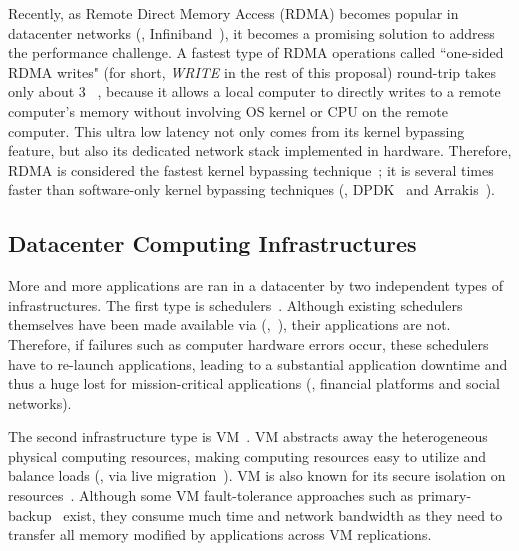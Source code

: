 Recently, as Remote Direct Memory Access (RDMA) becomes popular in datacenter 
networks (\eg, Infiniband~\cite{infiniband}), it becomes a promising solution 
to address the \paxos performance challenge. A fastest type of RDMA operations 
called ``one-sided RDMA writes" (for short, \emph{WRITE} in the rest of this 
proposal) round-trip takes only about 3 \us~\cite{pilaf:usenix14}, because it 
allows a local computer to directly writes to a remote computer's memory 
without involving OS kernel or CPU on the remote computer. This ultra low 
latency not only comes from its kernel bypassing feature, but also its 
dedicated network stack implemented in hardware. Therefore, RDMA is considered 
the fastest kernel bypassing 
technique~\cite{herd:sigcomm14,pilaf:usenix14,dare:hpdc15}; it is several times 
faster than software-only kernel bypassing techniques (\eg, 
DPDK~\cite{dpdk} and Arrakis~\cite{arrakis:osdi14}).

\vspace{-.15in}\subsection{Datacenter Computing Infrastructures}
\label{sec:datacenter}\vspace{-.075in}

More and more applications are ran in a datacenter by two 
independent types of infrastructures. The first type is 
schedulers~\cite{borg:eurosys15,mesos:nsdi11,tupperware, yarn:socc13, 
autopilot:sosp07,quincy:sosp09,apollo:osdi14,fuxi:vldb14}. Although existing 
schedulers themselves have been made available via \paxos 
(\eg,~\cite{mesos:nsdi11}), their applications are not. Therefore, if failures 
such as computer hardware errors occur, these schedulers have to re-launch 
applications, leading to a substantial application downtime and thus a 
huge lost for mission-critical applications (\eg, financial platforms and social 
networks).

The second infrastructure type is VM~\cite{amazon:vpc, openstack, esx:osdi02, 
kvm, xen:sosp}. VM abstracts away the heterogeneous physical computing 
resources, making computing resources easy to utilize and balance loads (\eg, 
via live migration~\cite{vmotion:atc05,xen:migration:nsdi05}). VM is also known 
for its secure isolation on resources~\cite{xen:sosp,kvm,vmware:sugerman}. 
Although some VM fault-tolerance approaches such 
as primary-backup~\cite{remus:nsdi08,ftvm} exist, they consume much 
time and network bandwidth as they need to transfer all memory modified by 
applications across VM replications.


